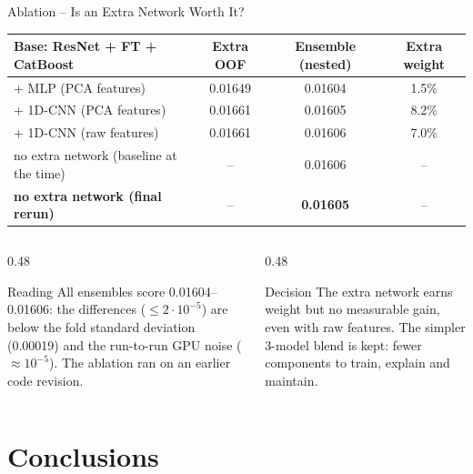 \documentclass[9pt,aspectratio=169]{beamer}
\begin{document}
\begin{frame}{Ablation -- Is an Extra Network Worth It?}
  \centering
  \small
  \begin{tabular}{@{}lccc@{}}
    \toprule
    \textbf{Base: ResNet + FT + CatBoost} & \textbf{Extra OOF} & \textbf{Ensemble (nested)} & \textbf{Extra weight} \\
    \midrule
    + MLP (PCA features) & 0.01649 & 0.01604 & 1.5\% \\
    + 1D-CNN (PCA features) & 0.01661 & 0.01605 & 8.2\% \\
    + 1D-CNN (raw features) & 0.01661 & 0.01606 & 7.0\% \\
    no extra network (baseline at the time) & -- & 0.01606 & -- \\
    \textbf{no extra network (final rerun)} & -- & \textbf{0.01605} & -- \\
    \bottomrule
  \end{tabular}
  \vspace{3mm}

  \begin{columns}[T]
    \begin{column}{0.48\textwidth}
      \begin{block}{Reading}
        \small All ensembles score 0.01604--0.01606: the differences ($\le 2\cdot10^{-5}$) are below the fold standard deviation (0.00019) and the run-to-run GPU noise ($\approx 10^{-5}$). The ablation ran on an earlier code revision.
      \end{block}
    \end{column}
    \begin{column}{0.48\textwidth}
      \begin{exampleblock}{Decision}
        \small The extra network earns weight but no measurable gain, even with raw features. The simpler 3-model blend is kept: fewer components to train, explain and maintain.
      \end{exampleblock}
    \end{column}
  \end{columns}
\end{frame}

\section{Conclusions}
\end{document}
